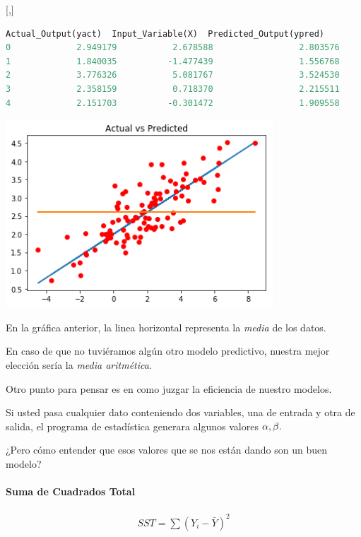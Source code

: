 [,]{} 
\begin{lstlisting}[language=Python]
   Actual_Output(yact)  Input_Variable(X)  Predicted_Output(ypred)
0             2.949179           2.678588                 2.803576
1             1.840035          -1.477439                 1.556768
2             3.776326           5.081767                 3.524530
3             2.358159           0.718370                 2.215511
4             2.151703          -0.301472                 1.909558
\end{lstlisting}


\begin{center}
 \includegraphics[width=10cm,keepaspectratio=true]{./images/actualVsPredicted.png}
\end{center}



En la gráfica anterior, la linea horizontal representa la \emph{media} de los datos.


En caso de que no tuviéramos algún otro modelo predictivo, nuestra mejor elección sería la \emph{media aritmética}.


Otro punto para pensar es en como juzgar la eficiencia de nuestro modelos. 

Si usted pasa cualquier dato conteniendo dos variables, una de entrada y otra de salida, el programa de estadística generara algunos valores $\alpha,\beta.$



¿Pero cómo entender que esos valores que se nos están dando son un buen modelo?

\paragraph{Suma de Cuadrados Total}
\begin{align}
 SST = \sum\left( Y_{i}-\bar{Y} \right)^{2}
\end{align}

